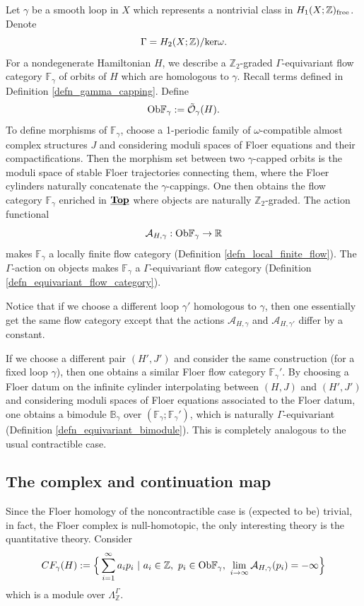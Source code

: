 \documentclass[reqno, 10pt]{amsart}
\numberwithin{equation}{section}
\numberwithin{equation}{section}
\theoremstyle{definition}
\theoremstyle{remark}
\newcommand{\beqn}{\begin{equation*}}
\newcommand{\eeqn}{\end{equation*}}
\newcommand{\mb}{\mathbb}
\newcommand{\mc}{\mathcal}
\newcommand{\uds}[1]{\underline{\smash{#1}}}
\begin{document}
Let $\gamma$ be a smooth loop in $X$ which represents a nontrivial class in $H_1(X; {\mb Z})_{\rm free}$. Denote
\beqn
\Gamma = H_2(X; {\mb Z})/ {\rm ker} \omega.
\eeqn
For a nondegenerate Hamiltonian $H$, we describe a ${\mb Z}_2$-graded $\Gamma$-equivariant flow category ${\mb F}_\gamma$ of orbits of $H$ which are homologous to $\gamma$. Recall terms defined in Definition \ref{defn_gamma_capping}. Define
\beqn
{\rm Ob} {\mb F}_\gamma:= \tilde {\mc O}_\gamma(H).
\eeqn
To define morphisms of ${\mb F}_\gamma$, choose a 1-periodic family of $\omega$-compatible almost complex structures $J$ and considering moduli spaces of Floer equations and their compactifications. Then the morphism set between two $\gamma$-capped orbits is the moduli space of stable Floer trajectories connecting them, where the Floer cylinders naturally concatenate the $\gamma$-cappings. One then obtains the flow category $\mb{F}_\gamma$ enriched in $\uds{\bf Top}$ where objects are naturally ${\mb Z}_2$-graded. The action functional 
\beqn
{\mc A}_{H, \gamma}: {\rm Ob}{\mb F}_\gamma \to {\mb R}
\eeqn
makes ${\mb F}_\gamma$ a locally finite flow category (Definition \ref{defn_local_finite_flow}). The $\Gamma$-action on objects makes ${\mb F}_\gamma$ a $\Gamma$-equivariant flow category (Definition \ref{defn_equivariant_flow_category}). 

Notice that if we choose a different loop $\gamma'$ homologous to $\gamma$, then one essentially get the same flow category except that the actions ${\mc A}_{H, \gamma}$ and ${\mc A}_{H, \gamma'}$ differ by a constant.

If we choose a different pair $(H', J')$ and consider the same construction (for a fixed loop $\gamma$), then one obtains a similar Floer flow category ${\mb F}_\gamma'$. By choosing a Floer datum on the infinite cylinder interpolating between $(H, J)$ and $(H', J')$ and considering moduli spaces of Floer equations associated to the Floer datum, one obtains a bimodule $\mb{B}_\gamma$ over $({\mb F}_\gamma; {\mb F}_\gamma')$, which is naturally $\Gamma$-equivariant (Definition \ref{defn_equivariant_bimodule}). This is completely analogous to the usual contractible case. 




\subsection{The complex and continuation map}

Since the Floer homology of the noncontractible case is (expected to be) trivial, in fact, the Floer complex is null-homotopic, the only interesting theory is the quantitative theory. Consider
\beqn
CF_\gamma(H):= \Big\{ \sum_{i=1}^\infty a_i p_i\ |\ a_i \in {\mb Z},\ p_i \in {\rm Ob}{\mb F}_\gamma,\ \lim_{i \to \infty} {\mc A}_{H,\gamma} (p_i) = -\infty \Big\}
\eeqn
which is a module over $\Lambda_{{\mb Z}}^
\Gamma$. 
\end{document}
